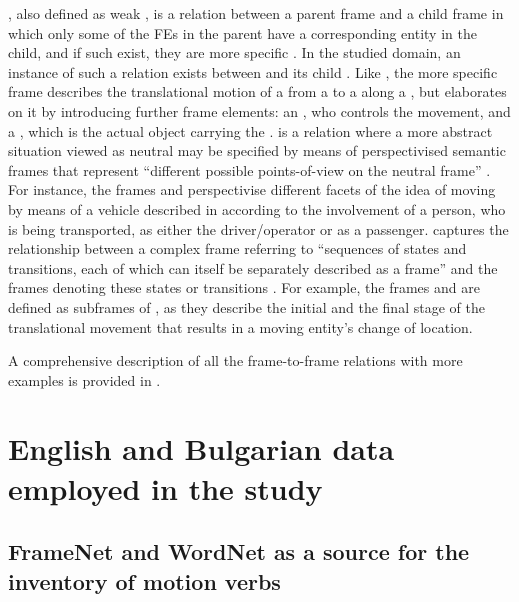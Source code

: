 \documentclass[output=paper,colorlinks,citecolor=brown]{langscibook}
\begin{document}
, also defined as weak  \citep{Petruck2015}, is a relation between a parent frame and a child frame in which only some of the FEs in the parent have a corresponding entity in the child, and if such exist, they are more specific \citep{Petruck2012}. In the studied domain, an instance of such a relation exists between  and its child . Like , the more specific frame describes the translational motion of a  from a  to a  along a , but elaborates on it by introducing further frame elements: an , who controls the movement, and a , which is the actual object carrying the .  is a relation where a more abstract situation viewed as neutral may be specified by means of perspectivised semantic frames that represent ``different possible points-of-view on the neutral frame'' \citep[82]{Ruppenhofer2016}. For instance, the frames  and  perspectivise different facets of the idea of moving by means of a vehicle described in  according to the involvement of a person, who is being transported, as either the driver/operator or as a passenger.  captures the relationship between a complex frame referring to ``sequences of states and transitions, each of which can itself be separately described as a frame'' and the frames denoting these states or transitions \citep[83–84]{Ruppenhofer2016}. For example, the frames  and  are defined as subframes of , as they describe the initial and the final stage of the translational movement that results in a moving entity's change of location.

A comprehensive description of all the frame-to-frame relations with more examples is provided in \citet{Ruppenhofer2016}.

\section{English and Bulgarian data employed in the study}

\subsection{FrameNet and WordNet as a source for the inventory of motion verbs}
\end{document}

